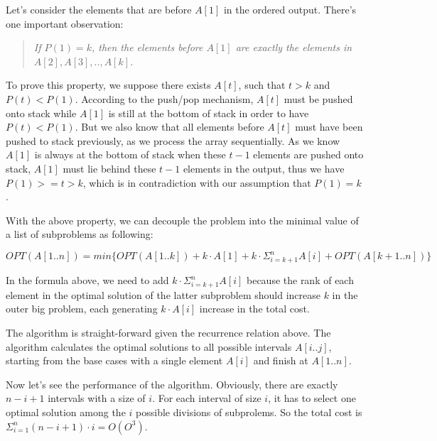 Let's consider the elements that are before $A[1]$ in the ordered output. There's one important observation:

\begin{quote}
\textit{If $P(1) = k$, then the elements before $A[1]$ are exactly the elements in $A[2], A[3], .., A[k]$.}
\end{quote}

To prove this property, we suppose there exists $A[t]$, such that $t > k$ and $P(t) < P(1)$. According to the push/pop mechanism, $A[t]$ must be pushed onto stack while $A[1]$ is still at the bottom of stack in order to have $P(t) < P(1)$. But we also know that all elements before $A[t]$ must have been pushed to stack previously, as we process the array sequentially. As we know $A[1]$ is always at the bottom of stack when these $t - 1$ elements are pushed onto stack, $A[1]$ must lie behind these $t - 1$ elements in the output, thus we have $P(1) >= t > k$, which is in contradiction with our assumption that $P(1) = k$.

With the above property, we can decouple the problem into the minimal value of a list of subproblems as following:

\[
OPT(A[1..n]) = min \{ OPT(A[1..k]) + k \cdot A[1] + k \cdot \Sigma_{i = k + 1}^{n}A[i] + OPT(A[k+1..n]) \}
\]

In the formula above, we need to add $k \cdot \Sigma_{i = k + 1}^{n}A[i]$ because the rank of each element in the optimal solution of the latter subproblem should increase $k$ in the outer big problem, each generating $k\cdot A[i]$ increase in the total cost.

The algorithm is straight-forward given the recurrence relation above. The algorithm calculates the optimal solutions to all possible intervals $A[i..j]$, starting from the base cases with a single element $A[i]$ and finish at $A[1..n]$.

Now let's see the performance of the algorithm. Obviously, there are exactly $n - i + 1$ intervals with a size of $i$. For each interval of size $i$, it has to select one optimal solution among the $i$ possible divisions of subprolems. So the total cost is $\Sigma_{i=1}^{n} (n - i + 1) \cdot i = O(O^3)$.